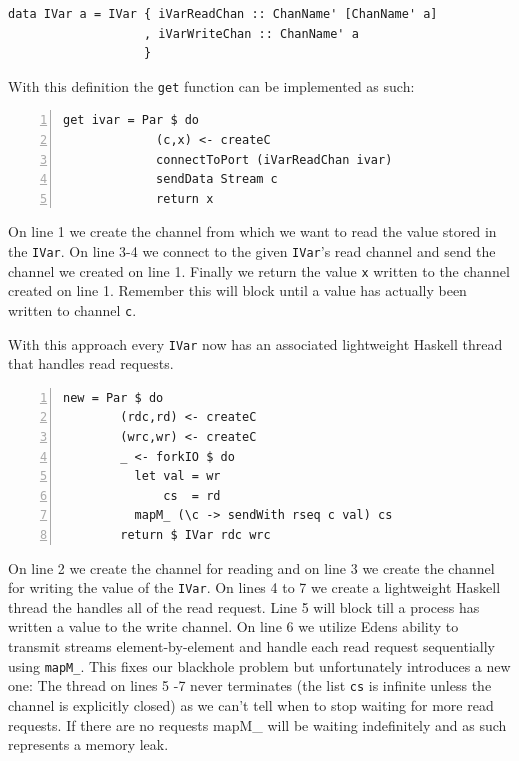 \documentclass[a4paper, oneside, final]{article}
\begin{document}
\begin{lstlisting}
data IVar a = IVar { iVarReadChan :: ChanName' [ChanName' a]
                   , iVarWriteChan :: ChanName' a
                   }
\end{lstlisting}

With this definition the \texttt{get} function can be implemented as 
such: \newline

\begin{lstlisting}[numbers=left, numberstyle=\tiny]
get ivar = Par $ do
             (c,x) <- createC
             connectToPort (iVarReadChan ivar)
             sendData Stream c
             return x
\end{lstlisting}

On line 1 we create the channel from which we want to read the value
stored in the \texttt{IVar}. On line 3-4 we connect to the given
\texttt{IVar}'s read channel and send the channel we created on line 1. 
Finally we return the value \texttt{x} written to the channel created on line 1. Remember this will block until a value has actually been written to 
channel \texttt{c}.

With this approach every \texttt{IVar} now has an associated lightweight
Haskell thread that handles read requests. \newline

\begin{lstlisting}[numbers=left, numberstyle=\tiny]
new = Par $ do
        (rdc,rd) <- createC
        (wrc,wr) <- createC
        _ <- forkIO $ do
          let val = wr
              cs  = rd
          mapM_ (\c -> sendWith rseq c val) cs
        return $ IVar rdc wrc
\end{lstlisting}

On line 2 we create the channel for reading and on line 3 we create
the channel for writing the value of the \texttt{IVar}. On lines 4 to
7 we create a lightweight Haskell thread the handles all of the read
request. Line 5 will block till a process has written a value to the
write channel. On line 6 we utilize Edens ability to transmit streams
element-by-element and handle each read request sequentially using
\texttt{mapM\_}. This fixes our blackhole problem but unfortunately
introduces a new one: The thread on lines 5 -7 never terminates (the
list \texttt{cs} is infinite unless the channel is explicitly closed)
as we can't tell when to stop waiting for more read requests. If there
are no requests mapM\_ will be waiting indefinitely and as such
represents a memory leak.
\end{document}

